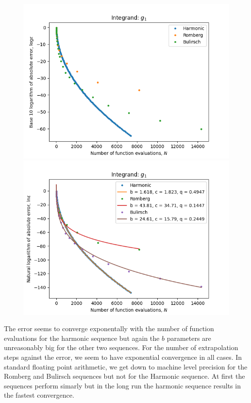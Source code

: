 \begin{figure}[H]
\centering
\begin{minipage}{0.45\textwidth}
\centering
\includegraphics[scale=0.45]{romberg_plots/g_one_hp.png}
\end{minipage}
\begin{minipage}{0.45\textwidth}
\centering
\includegraphics[scale=0.45]{romberg_plots/g_one_hp_trend.png}
\end{minipage}
\end{figure}

The error seems to converge exponentally with the number of function evaluations for the harmonic sequence but again the \(b\) parameters are unreasonably big for the other two sequences. For the number of extrapolation steps against the error, we seem to have exponential convergence in all cases. In standard floating point arithmetic, we get down to machine level precision for the Romberg and Bulirsch sequences but not for the Harmonic sequence. At first the sequences perform simarly but in the long run the harmonic sequence results in the fastest convergence.

